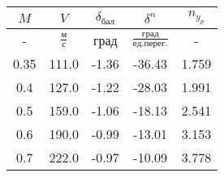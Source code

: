 \begin{tabular}{|c|c|c|c|c|}
\hline
$M$ & $V$ & $\delta_{бал}$ & $\delta^{n}$ & $n_{y_{p}}$ \\ 
\hline
- & $\frac{м}{с}$ & град & $\frac{град}{ед.перег.}$ & - \\ 
\hline
0.35 & 111.0 & -1.36 & -36.43 & 1.759 \\ 
\hline
0.4 & 127.0 & -1.22 & -28.03 & 1.991 \\ 
\hline
0.5 & 159.0 & -1.06 & -18.13 & 2.541 \\ 
\hline
0.6 & 190.0 & -0.99 & -13.01 & 3.153 \\ 
\hline
0.7 & 222.0 & -0.97 & -10.09 & 3.778 \\ 
\hline
\end{tabular}